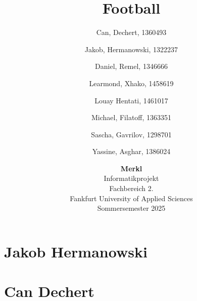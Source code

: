 \documentclass[12pt]{article}
\author{
	Can, Dechert, 1360493\\
	\and
	Jakob, Hermanowski, 1322237\\
	\and
	Daniel, Remel, 1346666\\
	\and
	Learmond, Xhako, 1458619\\
	\and
	Louay Hentati, 1461017\\
	\and
	Michael, Filatoff, 1363351\\
	\and
	Sascha, Gavrilov, 1298701\\
	\and
	Yassine, Asghar, 1386024\\
}
\title{Football}
\date{\vspace{0.5cm}
	\textbf{Merkl}
	\vspace{0.5cm} \\
	Informatikprojekt
	\vspace{0.5cm}\\
	Fachbereich 2.
	\vspace{0.5cm}\\
	Fankfurt University of Applied Sciences
	\vspace{0.5cm} \\
	Sommersemester 2025}
\begin{document}
\maketitle
\pagebreak
\tableofcontents

\pagebreak
\section{Jakob Hermanowski}


\pagebreak
\section{Can Dechert}

\end{document}
